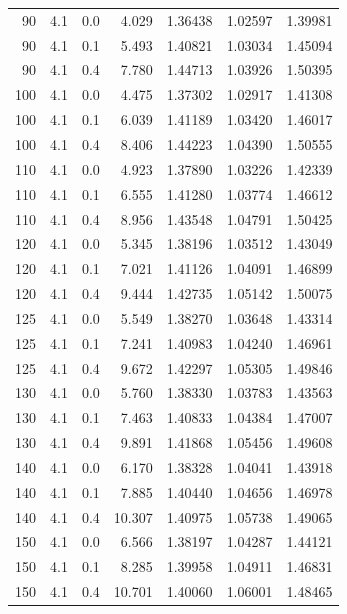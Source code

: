 \begin{longtable}{rrrrrrr}
\num{90} & \num{4.1} & \num{0.0} & \num{4.029} & \num{1.36438} & \num{1.02597} & \num{1.39981}\\
\num{90} & \num{4.1} & \num{0.1} & \num{5.493} & \num{1.40821} & \num{1.03034} & \num{1.45094}\\
\num{90} & \num{4.1} & \num{0.4} & \num{7.780} & \num{1.44713} & \num{1.03926} & \num{1.50395}\\
\num{100} & \num{4.1} & \num{0.0} & \num{4.475} & \num{1.37302} & \num{1.02917} & \num{1.41308}\\
\num{100} & \num{4.1} & \num{0.1} & \num{6.039} & \num{1.41189} & \num{1.03420} & \num{1.46017}\\
\num{100} & \num{4.1} & \num{0.4} & \num{8.406} & \num{1.44223} & \num{1.04390} & \num{1.50555}\\
\num{110} & \num{4.1} & \num{0.0} & \num{4.923} & \num{1.37890} & \num{1.03226} & \num{1.42339}\\
\num{110} & \num{4.1} & \num{0.1} & \num{6.555} & \num{1.41280} & \num{1.03774} & \num{1.46612}\\
\num{110} & \num{4.1} & \num{0.4} & \num{8.956} & \num{1.43548} & \num{1.04791} & \num{1.50425}\\
\num{120} & \num{4.1} & \num{0.0} & \num{5.345} & \num{1.38196} & \num{1.03512} & \num{1.43049}\\
\num{120} & \num{4.1} & \num{0.1} & \num{7.021} & \num{1.41126} & \num{1.04091} & \num{1.46899}\\
\num{120} & \num{4.1} & \num{0.4} & \num{9.444} & \num{1.42735} & \num{1.05142} & \num{1.50075}\\
\num{125} & \num{4.1} & \num{0.0} & \num{5.549} & \num{1.38270} & \num{1.03648} & \num{1.43314}\\
\num{125} & \num{4.1} & \num{0.1} & \num{7.241} & \num{1.40983} & \num{1.04240} & \num{1.46961}\\
\num{125} & \num{4.1} & \num{0.4} & \num{9.672} & \num{1.42297} & \num{1.05305} & \num{1.49846}\\
\num{130} & \num{4.1} & \num{0.0} & \num{5.760} & \num{1.38330} & \num{1.03783} & \num{1.43563}\\
\num{130} & \num{4.1} & \num{0.1} & \num{7.463} & \num{1.40833} & \num{1.04384} & \num{1.47007}\\
\num{130} & \num{4.1} & \num{0.4} & \num{9.891} & \num{1.41868} & \num{1.05456} & \num{1.49608}\\
\num{140} & \num{4.1} & \num{0.0} & \num{6.170} & \num{1.38328} & \num{1.04041} & \num{1.43918}\\
\num{140} & \num{4.1} & \num{0.1} & \num{7.885} & \num{1.40440} & \num{1.04656} & \num{1.46978}\\
\num{140} & \num{4.1} & \num{0.4} & \num{10.307} & \num{1.40975} & \num{1.05738} & \num{1.49065}\\
\num{150} & \num{4.1} & \num{0.0} & \num{6.566} & \num{1.38197} & \num{1.04287} & \num{1.44121}\\
\num{150} & \num{4.1} & \num{0.1} & \num{8.285} & \num{1.39958} & \num{1.04911} & \num{1.46831}\\
\num{150} & \num{4.1} & \num{0.4} & \num{10.701} & \num{1.40060} & \num{1.06001} & \num{1.48465}\\
\end{longtable}
